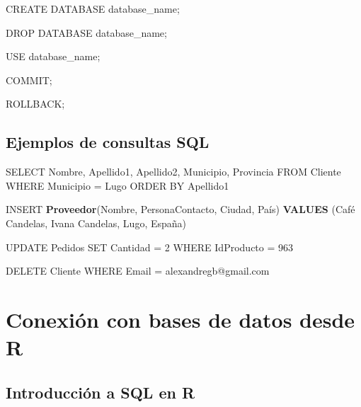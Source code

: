\documentclass[
]{book}
\newenvironment{Shaded}{\begin{snugshade}}{\end{snugshade}}
\newcommand{\DecValTok}[1]{\textcolor[rgb]{0.00,0.00,0.81}{#1}}
\newcommand{\FunctionTok}[1]{\textcolor[rgb]{0.13,0.29,0.53}{\textbf{#1}}}
\newcommand{\NormalTok}[1]{#1}
\newcommand{\OtherTok}[1]{\textcolor[rgb]{0.56,0.35,0.01}{#1}}
\newcommand{\StringTok}[1]{\textcolor[rgb]{0.31,0.60,0.02}{#1}}
\begin{document}
\begin{Shaded}
\begin{Highlighting}[]
\NormalTok{CREATE DATABASE database\_name;}

\NormalTok{DROP DATABASE database\_name;}

\NormalTok{USE database\_name;}

\NormalTok{COMMIT;}

\NormalTok{ROLLBACK;}
\end{Highlighting}
\end{Shaded}

\hypertarget{ejemplos-de-consultas-sql}{%
\subsection{Ejemplos de consultas SQL}\label{ejemplos-de-consultas-sql}}

\begin{Shaded}
\begin{Highlighting}[]
\NormalTok{SELECT Nombre, Apellido1, Apellido2, Municipio, Provincia }
\NormalTok{FROM Cliente}
\NormalTok{WHERE Municipio }\OtherTok{=} \StringTok{\textquotesingle{}Lugo\textquotesingle{}}
\NormalTok{ORDER BY Apellido1}

\NormalTok{INSERT }\FunctionTok{Proveedor}\NormalTok{(Nombre, PersonaContacto, Ciudad, País)}
\FunctionTok{VALUES}\NormalTok{ (}\StringTok{\textquotesingle{}Café Candelas\textquotesingle{}}\NormalTok{, }\StringTok{\textquotesingle{}Ivana Candelas\textquotesingle{}}\NormalTok{, }\StringTok{\textquotesingle{}Lugo\textquotesingle{}}\NormalTok{, }\StringTok{\textquotesingle{}España\textquotesingle{}}\NormalTok{)}

\NormalTok{UPDATE Pedidos}
\NormalTok{SET Cantidad }\OtherTok{=} \DecValTok{2}
\NormalTok{WHERE IdProducto }\OtherTok{=} \DecValTok{963}

\NormalTok{DELETE Cliente}
\NormalTok{WHERE Email }\OtherTok{=} \StringTok{\textquotesingle{}alexandregb@gmail.com\textquotesingle{}}
\end{Highlighting}
\end{Shaded}

\hypertarget{conexiuxf3n-con-bases-de-datos-desde-r}{%
\section{Conexión con bases de datos desde R}\label{conexiuxf3n-con-bases-de-datos-desde-r}}

\hypertarget{introducciuxf3n-a-sql-en-r}{%
\subsection{Introducción a SQL en R}\label{introducciuxf3n-a-sql-en-r}}
\end{document}
